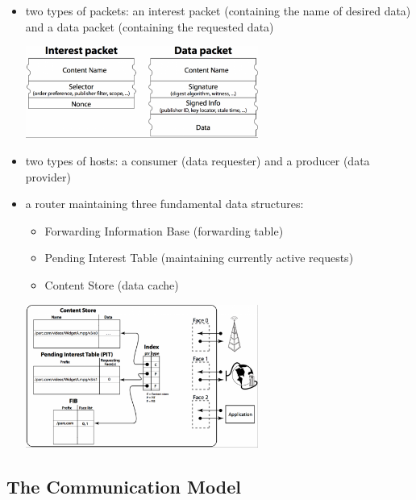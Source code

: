                 \begin{itemize}
                    \item two types of packets: an interest packet (containing the name of desired data) and a data packet (containing the requested data)
                \begin{center}\includegraphics[width=0.6\textwidth]{media/ndn_packets1.png}\end{center}
                    \item two types of hosts: a consumer (data requester) and a producer (data provider)
                    \item a router maintaining three fundamental data structures:
                    \begin{itemize}
                        \item Forwarding Information Base (forwarding table)
                        \item Pending Interest Table (maintaining currently active requests)
                        \item Content Store (data cache)
                    \end{itemize}
                    \begin{center}\includegraphics[width=0.6\textwidth]{media/ndn_router1.png}\end{center}

                \end{itemize}

            \subsection{The Communication Model}

